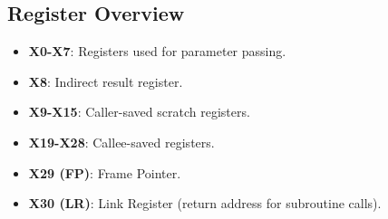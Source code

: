 \documentclass[12pt]{article}
\begin{document}
	\subsection{Register Overview}
	\begin{itemize}
		\item \textbf{X0-X7}: Registers used for parameter passing.
		\item \textbf{X8}: Indirect result register.
		\item \textbf{X9-X15}: Caller-saved scratch registers.
		\item \textbf{X19-X28}: Callee-saved registers.
		\item \textbf{X29 (FP)}: Frame Pointer.
		\item \textbf{X30 (LR)}: Link Register (return address for subroutine calls).
	\end{itemize}
%	
%	
%	
%	
%	
%	
%	
%	
%	
\end{document}
